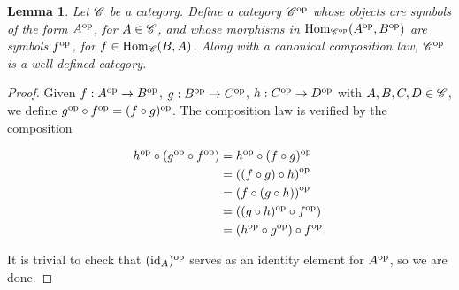 \documentclass{article}
\newtheorem{lemma}{Lemma}[section]
\theoremstyle{definition}
\numberwithin{figure}{section}
\begin{document}
\begin{lemma} Let $\mathscr{C}$ be a category. Define a category $\mathscr{C}^{\mathrm{op}}$ whose objects are symbols of the form $A^{\mathrm{op}}$, for $A\in \mathscr{C}$, and whose morphisms in $\mathrm{Hom}_{\mathscr{C}^{\mathrm{op}}}(A^{\mathrm{op}},B^{\mathrm{op}})$ are symbols $f^{\mathrm{op}}$, for $f\in \mathrm{Hom}_{\mathscr{C}}(B,A)$. Along with a canonical composition law, $\mathscr{C}^{\mathrm{op}}$ is a well defined category.
\end{lemma}
\begin{proof} Given $f:A^{\mathrm{op}}\to B^{\mathrm{op}}$, $g:B^{\mathrm{op}}\to C^{\mathrm{op}}$, $h:C^{\mathrm{op}}\to D^{\mathrm{op}}$ with $A,B,C,D\in \mathscr{C}$, we define $g^{\mathrm{op}}\circ f^{\mathrm{op}}=(f\circ g)^{\mathrm{op}}$. The composition law is verified by the composition

\begin{align*}
h^{\mathrm{op}}\circ (g^{\mathrm{op}}\circ f^{\mathrm{op}})&=h^{\mathrm{op}}\circ (f\circ g)^{\mathrm{op}}\\
&=\left((f\circ g)\circ h\right)^{\mathrm{op}}\\
&=\left(f\circ (g\circ h)\right)^{\mathrm{op}}\\
&=\left((g\circ h)^{\mathrm{op}}\circ f^{\mathrm{op}}\right)\\
&=(h^{\mathrm{op}}\circ g^{\mathrm{op}})\circ f^{\mathrm{op}}.\\
\end{align*}

It is trivial to check that $(\mathrm{id}_A)^{\mathrm{op}}$ serves as an identity element for $A^{\mathrm{op}}$, so we are done.
\end{proof}
\end{document}
